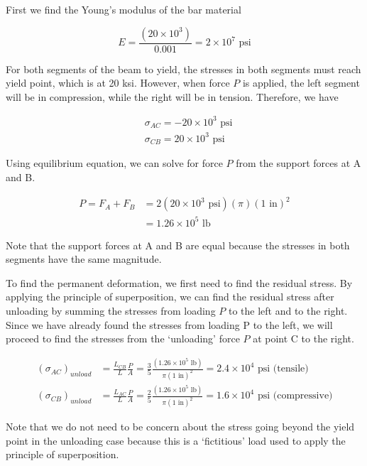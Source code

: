 \documentclass[
10pt,
a4paper,
openany,
svgnames,
]{book} %
\begin{document}
\begin{solution}
  
  First we find the Young’s modulus of the bar material
  
  \[E = \frac{{(20 \times {{10}^3})}}{{0.001}} = 2 \times {10^7} \text{ psi}\]	
  
  For both segments of the beam to yield, the stresses in both segments must reach yield point, which is at 20 ksi. However, when force $P$ is applied, the left segment will be in compression, while the right will be in tension. Therefore, we have
  
  \begin{align*}
    &{\sigma _{AC}} =  - 20 \times {10^3} \text{ psi} \\
    &{\sigma _{CB}} = 20 \times {10^3} \text{ psi}
  \end{align*}	

  Using equilibrium equation, we can solve for force $P$ from the support forces at A and B.
  
  \begin{align*}
    P = {F_A} + {F_B} &= 2(20 \times {10^3} \text{ psi})(\pi ){(1 \text{ in})^2} \\ 
                      &= 1.26 \times {10^5} \text{ lb}
  \end{align*}	
  
  Note that the support forces at A and B are equal because the stresses in both segments have the same magnitude.
  
  To find the permanent deformation, we first need to find the residual stress. By applying the principle of superposition, we can find the residual stress after unloading by summing the stresses from loading $P$ to the left and to the right. Since we have already found the stresses from loading P to the left, we will proceed to find the stresses from the ‘unloading’ force $P$ at point C to the right.
  
  \begin{align*}
    (\sigma _{AC})_{unload} &= \frac{L_{CB}}{L}\frac{P}{A} = \frac{3}{5} \frac{(1.26 \times 10^5 \text{ lb})}{\pi {(1 \text{ in})^2}} = 2.4 \times {10^4} \text{ psi} \text{ (tensile)} \\
  (\sigma _{CB})_{unload} &= \frac{L_{AC}}{L}\frac{P}{A} = \frac{2}{5} \frac{(1.26 \times 10^5 \text{ lb})}{\pi (1 \text{ in})^2} = 1.6 \times {10^4} \text{ psi} \text{ (compressive)}
  \end{align*}	
  
  Note that we do not need to be concern about the stress going beyond the yield point in the unloading case because this is a ‘fictitious’ load used to apply the principle of superposition.
  

\end{solution}
\end{document}
